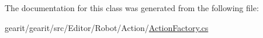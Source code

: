The documentation for this class was generated from the following file\+:\begin{DoxyCompactItemize}
\item 
gearit/gearit/src/\+Editor/\+Robot/\+Action/\hyperlink{_robot_2_action_2_action_factory_8cs}{Action\+Factory.\+cs}\end{DoxyCompactItemize}
